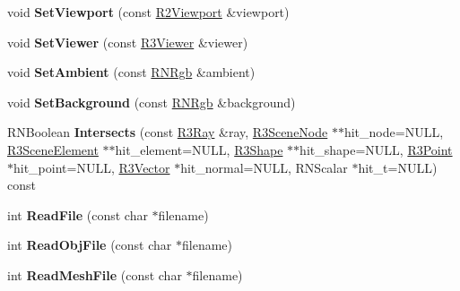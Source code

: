 \begin{DoxyCompactItemize}
\item 
void {\bfseries Set\+Viewport} (const \hyperlink{class_r2_viewport}{R2\+Viewport} \&viewport)\hypertarget{class_r3_scene_a34da45d63dad9594ecfc72393f4f7c7f}{}\label{class_r3_scene_a34da45d63dad9594ecfc72393f4f7c7f}

\item 
void {\bfseries Set\+Viewer} (const \hyperlink{class_r3_viewer}{R3\+Viewer} \&viewer)\hypertarget{class_r3_scene_a06916c10695566dc877982b20b334132}{}\label{class_r3_scene_a06916c10695566dc877982b20b334132}

\item 
void {\bfseries Set\+Ambient} (const \hyperlink{class_r_n_rgb}{R\+N\+Rgb} \&ambient)\hypertarget{class_r3_scene_a29e07fd01d1802b1049adf49fce18aa1}{}\label{class_r3_scene_a29e07fd01d1802b1049adf49fce18aa1}

\item 
void {\bfseries Set\+Background} (const \hyperlink{class_r_n_rgb}{R\+N\+Rgb} \&background)\hypertarget{class_r3_scene_a22ea693853c46f366dcaaf794a4f15ab}{}\label{class_r3_scene_a22ea693853c46f366dcaaf794a4f15ab}

\item 
R\+N\+Boolean {\bfseries Intersects} (const \hyperlink{class_r3_ray}{R3\+Ray} \&ray, \hyperlink{class_r3_scene_node}{R3\+Scene\+Node} $\ast$$\ast$hit\+\_\+node=N\+U\+LL, \hyperlink{class_r3_scene_element}{R3\+Scene\+Element} $\ast$$\ast$hit\+\_\+element=N\+U\+LL, \hyperlink{class_r3_shape}{R3\+Shape} $\ast$$\ast$hit\+\_\+shape=N\+U\+LL, \hyperlink{class_r3_point}{R3\+Point} $\ast$hit\+\_\+point=N\+U\+LL, \hyperlink{class_r3_vector}{R3\+Vector} $\ast$hit\+\_\+normal=N\+U\+LL, R\+N\+Scalar $\ast$hit\+\_\+t=N\+U\+LL) const \hypertarget{class_r3_scene_a1f5a1e49e518d76d3a3ab12a7b3841ee}{}\label{class_r3_scene_a1f5a1e49e518d76d3a3ab12a7b3841ee}

\item 
int {\bfseries Read\+File} (const char $\ast$filename)\hypertarget{class_r3_scene_addd82e576332e4e6dc7b7bda563b1ee0}{}\label{class_r3_scene_addd82e576332e4e6dc7b7bda563b1ee0}

\item 
int {\bfseries Read\+Obj\+File} (const char $\ast$filename)\hypertarget{class_r3_scene_a5a8d13e7491bc6b479f5e9f1cea5f2c1}{}\label{class_r3_scene_a5a8d13e7491bc6b479f5e9f1cea5f2c1}

\item 
int {\bfseries Read\+Mesh\+File} (const char $\ast$filename)\hypertarget{class_r3_scene_a7702a3e989887ec7a31b7abb9c6649ce}{}\label{class_r3_scene_a7702a3e989887ec7a31b7abb9c6649ce}


\end{DoxyCompactItemize}
